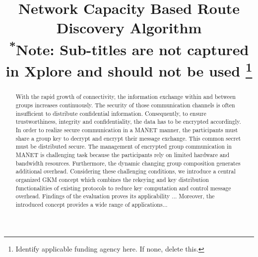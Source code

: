 \documentclass[conference]{IEEEtran}
\newcommand{\MANET}{MANET}
\begin{document}
\title{Network Capacity Based Route Discovery Algorithm\\
{\footnotesize \textsuperscript{*}Note: Sub-titles are not captured in Xplore and
should not be used}
\thanks{Identify applicable funding agency here. If none, delete this.}
}

\author{
\and
{}
\and
{}
}

\maketitle

\begin{abstract}
With the rapid growth of connectivity, the information exchange within and between groups 
increases continuously. The security of those communication channels is often insufficient to 
distribute confidential information. Consequently, to ensure trustworthiness, integrity and 
confidentiality, the data has to be encrypted accordingly. In order to realize secure communication 
in a \MANET{} manner, the participants must share a group key to decrypt and encrypt their 
message exchange. This common secret must be distributed secure. The management of encrypted group 
communication in \MANET{} is challenging task because the participants rely on limited hardware and 
bandwidth resources. Furthermore, the dynamic changing group composition generates additional overhead.
Considering these challenging conditions, we introduce a central organized GKM concept which 
combines the rekeying and key distribution functionalities of existing protocols to reduce key 
computation and control message overhead.  Findings of the evaluation proves its applicability ... 
Moreover, the introduced concept provides a wide range of applications... 
\end{abstract}
\end{document}
